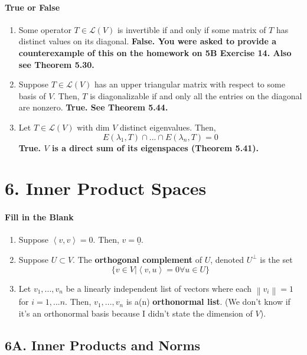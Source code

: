 \documentclass{article}
\newcommand{\norm}[1]{\left\lVert#1\right\rVert}
\newcommand{\iprod}[2]{\left\langle#1,#2\right\rangle}
\begin{document}
\paragraph{True or False}
\begin{enumerate}
    \item Some operator $T \in \mathcal{L}(V)$ is invertible if and only if some matrix of $T$ has distinct values on its diagonal.  \textbf{False. You were asked to provide a counterexample of this on the homework on 5B Exercise 14. Also see Theorem 5.30.}
    
    \item Suppose $T \in \mathcal{L}(V)$ has an upper triangular matrix with respect to some basis of $V$. Then, $T$ is diagonalizable if and only all the entries on the diagonal are nonzero. \textbf{True. See Theorem 5.44.}
    
    \item Let $T \in \mathcal{L}(V)$ with dim $V$ distinct eigenvalues. Then, 
    \[ E(\lambda_1, T) \cap ... \cap E(\lambda_n,T) = 0 \]
    \textbf{True. $V$ is a direct sum of its eigenspaces (Theorem 5.41).}
\end{enumerate}

\section*{6. Inner Product Spaces}
\paragraph{Fill in the Blank}
\begin{enumerate}
    \item Suppose $\iprod{v}{v} = 0$. Then, $v = \underline{0}$.
    \item Suppose $U \subset V$. The \textbf{orthogonal complement} of $U$, denoted $U^\perp$ is the set
    \[ \{ v \in V | \iprod{v}{u} = 0 \forall u \in U \} \]
    \item Let $v_1, ..., v_n$ be a linearly independent list of vectors where each $\norm{v_i} = 1$ for $i = 1, ... n$. Then, $v_1, ..., v_n$ is a(n) \textbf{orthonormal list}. (We don't know if it's an orthonormal basis because I didn't state the dimension of $V$).
\end{enumerate}

\subsection*{6A. Inner Products and Norms}
\end{document}
